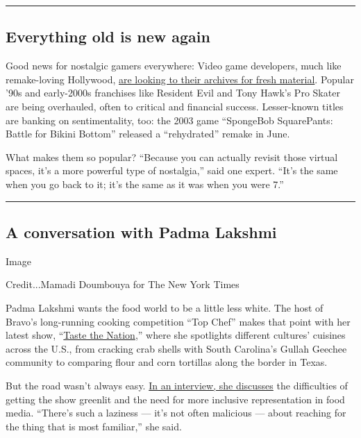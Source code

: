 \begin{center}\rule{0.5\linewidth}{\linethickness}\end{center}

\hypertarget{everything-old-is-new-again}{%
\subsection{Everything old is new
again}\label{everything-old-is-new-again}}

Good news for nostalgic gamers everywhere: Video game developers, much
like remake-loving Hollywood,
\href{https://www.nytimes.com/2020/08/01/business/video-game-remake-remaster-nostalgia.html}{are
looking to their archives for fresh material}. Popular '90s and
early-2000s franchises like Resident Evil and Tony Hawk's Pro Skater are
being overhauled, often to critical and financial success. Lesser-known
titles are banking on sentimentality, too: the 2003 game ``SpongeBob
SquarePants: Battle for Bikini Bottom'' released a ``rehydrated'' remake
in June.

What makes them so popular? ``Because you can actually revisit those
virtual spaces, it's a more powerful type of nostalgia,'' said one
expert. ``It's the same when you go back to it; it's the same as it was
when you were 7.''

\begin{center}\rule{0.5\linewidth}{\linethickness}\end{center}

\hypertarget{a-conversation-with-padma-lakshmi}{%
\subsection{A conversation with Padma
Lakshmi}\label{a-conversation-with-padma-lakshmi}}

Image

Credit...Mamadi Doumbouya for The New York Times

Padma Lakshmi wants the food world to be a little less white. The host
of Bravo's long-running cooking competition ``Top Chef'' makes that
point with her latest show,
``\href{https://www.nytimes.com/2020/06/18/dining/padma-lakshmi-taste-the-nation.html}{Taste
the Nation},'' where she spotlights different cultures' cuisines across
the U.S., from cracking crab shells with South Carolina's Gullah Geechee
community to comparing flour and corn tortillas along the border in
Texas.

But the road wasn't always easy.
\href{https://www.nytimes.com/interactive/2020/08/03/magazine/padma-lakshmi-interview.html}{In
an interview, she discusses} the difficulties of getting the show
greenlit and the need for more inclusive representation in food media.
``There's such a laziness --- it's not often malicious --- about
reaching for the thing that is most familiar,'' she said.

